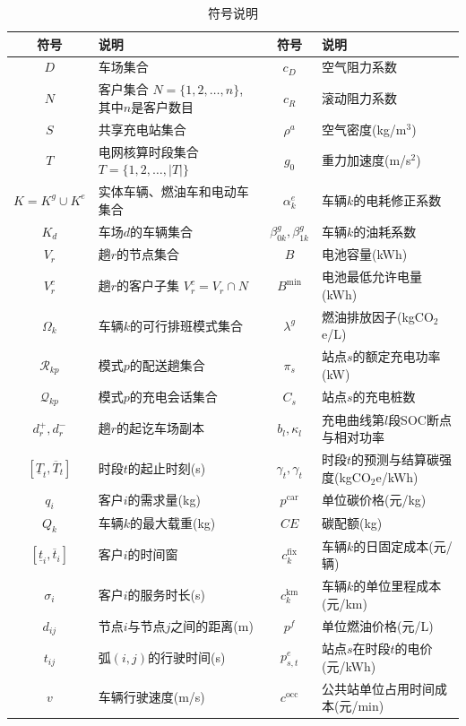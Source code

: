 \documentclass{setp-new}
\newcommand{\setpsymtabsetup}{\fontsize{9pt}{10.5pt}\selectfont\renewcommand{\arraystretch}{0.95}\setlength{\tabcolsep}{2.0pt}\setlength{\aboverulesep}{0.4pt}\setlength{\belowrulesep}{0.4pt}\hbadness=10000}
\begin{document}
\begin{table}[H]
\centering
\caption{符号说明}
\label{tab:symbols}
\setpsymtabsetup
\begin{tabular*}{\linewidth}{@{\extracolsep{\fill}}cJcJ@{}}
\toprule
符号 & 说明 & 符号 & 说明\\
\midrule
$D$ & 车场集合 & $c_D$ & 空气阻力系数\\
$N$ & 客户集合 $N=\{1,2,\dots,n\}$, 其中$n$是客户数目 & $c_R$ & 滚动阻力系数\\
$S$ & 共享充电站集合 & $\rho^a$ & 空气密度(kg/m$^3$)\\
$T$ & 电网核算时段集合 $T=\{1,2,\dots,|T|\}$ & $g_0$ & 重力加速度(m/s$^2$)\\
$K=K^g\cup K^e$ & 实体车辆、燃油车和电动车集合 & $\alpha_k^e$ & 车辆$k$的电耗修正系数\\
$K_d$ & 车场$d$的车辆集合 & $\beta_{0k}^g,\beta_{1k}^g$ & 车辆$k$的油耗系数\\
$V_r$ & 趟$r$的节点集合 & $B$ & 电池容量(kWh)\\
$V_r^c$ & 趟$r$的客户子集 $V_r^c=V_r\cap N$ & $B^{\min}$ & 电池最低允许电量(kWh)\\
$\Omega_k$ & 车辆$k$的可行排班模式集合 & $\lambda^g$ & 燃油排放因子(kgCO$_2$e/L)\\
$\mathcal R_{kp}$ & 模式$p$的配送趟集合 & $\pi_s$ & 站点$s$的额定充电功率(kW)\\
$\mathcal Q_{kp}$ & 模式$p$的充电会话集合 & $C_s$ & 站点$s$的充电桩数\\
$d_r^+,d_r^-$ & 趟$r$的起讫车场副本 & $b_l,\kappa_l$ & 充电曲线第$l$段SOC断点与相对功率\\
$[\underline T_t,\overline T_t]$ & 时段$t$的起止时刻(s) & $\widehat\gamma_t,\gamma_t$ & 时段$t$的预测与结算碳强度(kgCO$_2$e/kWh)\\
$q_i$ & 客户$i$的需求量(kg) & $p^{\mathrm{car}}$ & 单位碳价格(元/kg)\\
$Q_k$ & 车辆$k$的最大载重(kg) & $CE$ & 碳配额(kg)\\
$[\underline t_i,\overline t_i]$ & 客户$i$的时间窗 & $c_k^{\mathrm{fix}}$ & 车辆$k$的日固定成本(元/辆)\\
$\sigma_i$ & 客户$i$的服务时长(s) & $c_k^{\mathrm{km}}$ & 车辆$k$的单位里程成本(元/km)\\
$d_{ij}$ & 节点$i$与节点$j$之间的距离(m) & $p^f$ & 单位燃油价格(元/L)\\
$t_{ij}$ & 弧$(i,j)$的行驶时间(s) & $p_{s,t}^{e}$ & 站点$s$在时段$t$的电价(元/kWh)\\
$v$ & 车辆行驶速度(m/s) & $c^{\mathrm{occ}}$ & 公共站单位占用时间成本(元/min)\\

\end{tabular*}
\end{table}
\end{document}
